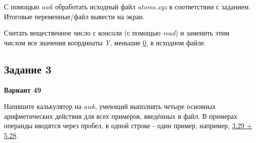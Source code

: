 \documentclass[12pt, a4paper]{report}
\begin{document}
	\par
	С помощью \textit{awk} обработать исходный файл \textit{atoms.xyz} в соответствии с заданием. Итоговые переменные/файл вывести на экран.
	\par
	Считать вещественное число с консоли (с помощью \textit{read}) и заменить этим числом все значения координаты \textit{Y}, меньшие \underline{0}, в исходном файле.
	\lstset{style=mystyle}
	
	

	\subsection*{Задание 3}
	\large
	\begin{center}
		\textbf{Вариант 49}
	\end{center}
	Напишите калькулятор на \textit{awk}, умеющий выполнять четыре основных арифметических действия для всех примеров, введённых в файл. В примерах операнды вводятся через пробел, в одной строке - один пример, например, \underline{3.29 + 5.28}.
	\par
	\lstset{style=mystyle}
	
	
\end{document}

